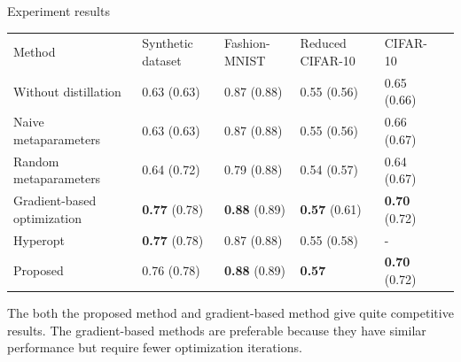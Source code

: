 \documentclass[12pt, aspectratio=169]{beamer}
\begin{document}
\begin{frame}{Experiment results}
\begin{table}
\label{table:results}
\footnotesize
\centering
\begin{tabularx}{\textwidth}{|X|X|X|X|X|X}
\cline{1-5}
Method                      & Synthetic dataset & Fashion-MNIST & Reduced CIFAR-10 & CIFAR-10      &  \\ \cline{1-5}
Without distillation        & 0.63 (0.63)             & 0.87  (0.88)        & 0.55     (0.56)        & 0.65 (0.66)         &  \\ \cline{1-5}
Naive metaparameters        & 0.63  (0.63)              & 0.87 (0.88)         & 0.55  (0.56)             & 0.66  (0.67)        &  \\ \cline{1-5}
Random metaparameters       & 0.64   (0.72)           & 0.79   (0.88)       & 0.54 (0.57)             & 0.64 (0.67)        &  \\ \cline{1-5}
Gradient-based optimization & \textbf{0.77} (0.78)    & \textbf{0.88} (0.89) & \textbf{0.57} (0.61)    & \textbf{0.70} (0.72) &  \\ \cline{1-5}
Hyperopt                    & \textbf{0.77} (0.78)                & 0.87 (0.88)         & 0.55  (0.58)           & -             &  \\ \cline{1-5}
Proposed                    & 0.76   (0.78)           & \textbf{0.88} (0.89) & \textbf{0.57}    & \textbf{0.70} (0.72) &  \\ \cline{1-5}
\end{tabularx}
\end{table}

\vspace{0.5 cm}

The  both  the  proposed method and gradient-based method give quite competitive results. The gradient-based methods are preferable because they have similar performance but require fewer  optimization  iterations.

\end{frame}
\end{document}
